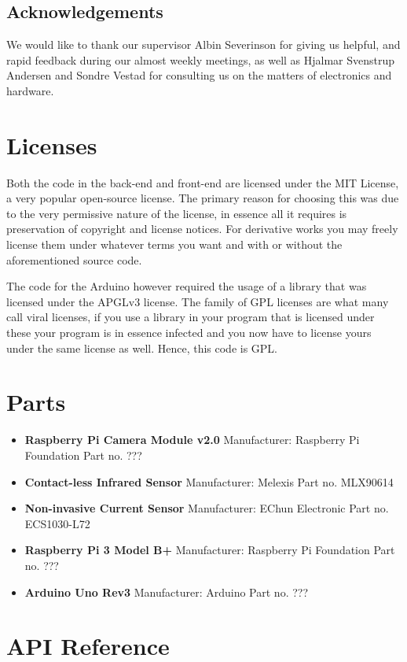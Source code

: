 \documentclass[12pt,a4paper,oneside,article]{memoir}
\numberwithin{equation}{chapter}
\begin{document}
\section{Acknowledgements}\label{sec:acknowledgements}
We would like to thank our supervisor Albin Severinson for giving us helpful, 
and rapid feedback during our almost weekly meetings, as well as Hjalmar 
Svenstrup Andersen and Sondre Vestad for consulting us on the matters of 
electronics and hardware.

\clearpage
\appendix
\chapter{Licenses}\label{sec:licenses}
Both the code in the back-end and front-end are licensed under the MIT License,
a very popular open-source license. The primary reason for choosing this was due
to the very permissive nature of the license, in essence all it requires is
preservation of copyright and license notices. For derivative works you may
freely license them under whatever terms you want and with or without the
aforementioned source code.

The code for the Arduino however required the usage of a library that was
licensed under the APGLv3 license. The family of GPL licenses are what many call
viral licenses, if you use a library in your program that is licensed under
these your program is in essence infected and you now have to license yours
under the same license as well. Hence, this code is GPL.

\chapter{Parts}\label{sec:parts}
\begin{itemize}
\item \textbf{Raspberry Pi Camera Module v2.0} \newline
Manufacturer: Raspberry Pi Foundation \newline
Part no. ???

\item \textbf{Contact-less Infrared Sensor} \newline
Manufacturer: Melexis \newline
Part no. MLX90614

\item \textbf{Non-invasive Current Sensor} \newline
Manufacturer: EChun Electronic \newline
Part no. ECS1030-L72

\item \textbf{Raspberry Pi 3 Model B+} \newline
Manufacturer: Raspberry Pi Foundation \newline
Part no. ???

\item \textbf{Arduino Uno Rev3} \newline
Manufacturer: Arduino \newline
Part no. ???
\end{itemize}

\chapter{API Reference}\label{sec:api-reference}

\clearpage{}
\renewcommand*{\UrlFont}{\footnotesize\ttfamily}
\printbibliography{}
\end{document}
